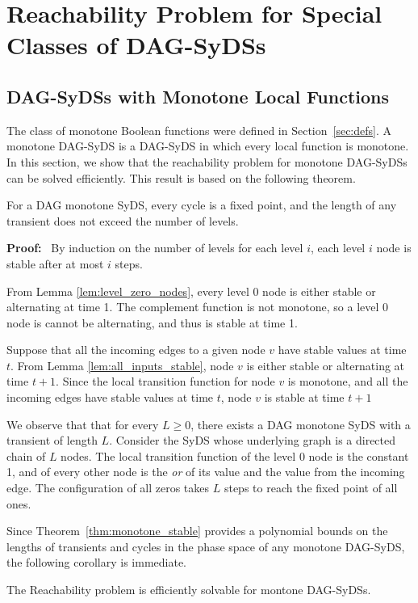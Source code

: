 \section{Reachability Problem for Special Classes of DAG-SyDSs}

\subsection{DAG-SyDSs with Monotone Local Functions}
\label{sse:monotoner_functions}

The class of monotone Boolean functions were defined in
Section~\ref{sec:defs}.
A monotone DAG-SyDS is a DAG-SyDS in which every local
function is monotone.
In this section, we show that the reachability problem
for monotone DAG-SyDSs can be solved efficiently.
This result is based on the following theorem. 

\begin{theorem}\label{thm:monotone_stable}
For a DAG monotone SyDS, every cycle is a fixed point, 
and the length of any transient does not exceed the number of levels.
\end{theorem}
\noindent
\textbf{Proof:}~ 
By induction on the number of levels for each level $i$, 
each level $i$ node is stable after at most $i$ steps.

From Lemma \ref{lem:level_zero_nodes}, every level 0 node is either
stable or alternating  at time 1.  The complement function is not
monotone, so a  level 0 node is cannot be alternating, and thus is
stable at time 1.

Suppose that all the incoming edges to a given node $v$ have stable
values at time $t$.  From Lemma \ref{lem:all_inputs_stable}, node
$v$ is either stable or alternating  at time $t+1$.  Since the local
transition function for node $v$ is monotone, and all the incoming
edges have stable values at time $t$, node $v$ is stable at time
$t+1$ \QED

We observe that that for every $L \geq 0$, there exists a DAG
monotone SyDS with a transient of length $L$.  Consider the SyDS
whose underlying graph is a directed chain of $L$ nodes.  The local
transition function of the level 0 node is the constant 1, and of
every other node is the {\em or} of its value and the value from
the incoming edge.  The configuration of all zeros takes $L$ steps
to reach the fixed point of all ones.

Since Theorem~\ref{thm:monotone_stable} provides a polynomial bounds
on the lengths of transients and cycles in the phase space of any
monotone DAG-SyDS, the following corollary is immediate.

\begin{corollary}\label{cor:poly_monotone_dag_syds}
The Reachability problem is efficiently solvable for montone
DAG-SyDSs.
\end{corollary}


